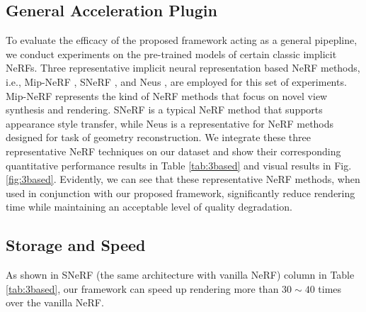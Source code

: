 \documentclass[letterpaper]{article} %
\begin{document}
\subsection{General Acceleration Plugin}
To evaluate the efficacy of the proposed framework acting as a general pipepline, we conduct experiments on the pre-trained models of certain classic implicit NeRFs. Three representative
implicit neural representation based NeRF methods, i.e., Mip-NeRF \cite{barron2021mip},
SNeRF \cite{snerf2022}, and Neus \cite{wang2021neus}, are employed for this set of experiments.
Mip-NeRF represents the kind of NeRF methods that focus on novel view synthesis and rendering. SNeRF is a typical NeRF method that supports appearance style transfer, while Neus is a representative for NeRF methods designed for task of geometry reconstruction.
We integrate these three representative NeRF techniques on our dataset and show their corresponding quantitative performance results in Table \ref{tab:3based} and visual results in Fig. \ref{fig:3based}. Evidently, we can see that these representative NeRF methods, when used in conjunction with our proposed framework, significantly reduce rendering time while maintaining an acceptable level of quality degradation.

\subsection{Storage and Speed}
As shown in SNeRF (the same architecture with vanilla NeRF) column in Table \ref{tab:3based}, our framework can speed up rendering more than $30 \sim 40$ times over the vanilla NeRF.
\end{document}
